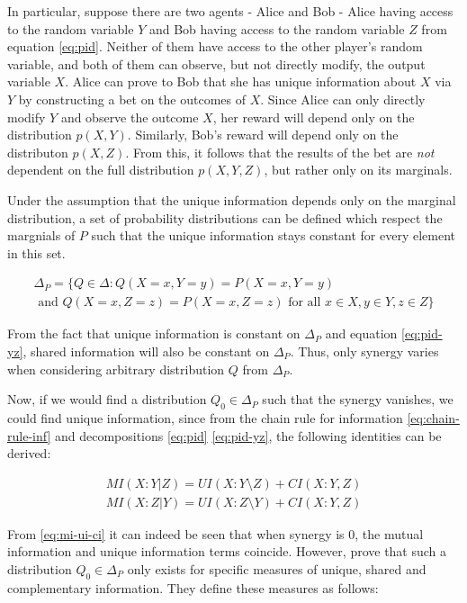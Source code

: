 \documentclass[12pt]{article}
\begin{document}
In particular, suppose there are two agents - Alice and Bob - Alice having access to the random variable $Y$ and Bob having access to the random variable $Z$ from equation \ref{eq:pid}. Neither of them have access to the other player's random variable, and both of them can observe, but not directly modify, the output variable $X$. Alice can prove to Bob that she has unique information about $X$ via $Y$ by constructing a bet on the outcomes of $X$. Since Alice can only directly modify $Y$ and observe the outcome $X$, her reward will depend only on the distribution $p(X,Y)$. Similarly, Bob's reward will depend only on the distributon $p(X,Z)$. From this, it follows that the results of the bet are \textit{not} dependent on the full distribution $p(X,Y,Z)$, but rather only on its marginals.

Under the assumption that the unique information depends only on the  marginal distribution, a set of probability distributions can be defined which respect the margnials of $P$ such that the unique information stays constant for every element in this set.

\begin{multline*}
\Delta_P = \{Q \in \Delta: Q(X=x, Y=y) = P(X=x, Y=y) \\ 
\text{ and }  Q(X=x, Z=z) = P(X=x, Z=z) \text{ for all } x \in X, y \in Y, z \in Z\}
\end{multline*}

From the fact that unique information is constant on $\Delta_P$ and equation \ref{eq:pid-yz}, shared information will also be constant on $\Delta_P$. Thus, only synergy varies when considering arbitrary distribution $Q$ from $\Delta_P$.

Now, if we would find a distribution $Q_0 \in \Delta_P$ such that the synergy vanishes, we could find unique information, since from the chain rule for information \ref{eq:chain-rule-inf} and decompositions \ref{eq:pid} \ref{eq:pid-yz}, the following identities can be derived: 

\begin{equation}
\begin{split}
MI(X:Y|Z) = UI(X:Y \setminus Z) + CI(X:Y,Z) \\ 
MI(X:Z|Y) = UI(X:Z \setminus Y) + CI(X:Y,Z)
\label{eq:mi-ui-ci}
\end{split}
\end{equation}

From \ref{eq:mi-ui-ci} it can indeed be seen that when synergy is $0$, the mutual information and unique information terms coincide. However, \cite{bertschinger} prove that such a distribution $Q_0 \in \Delta_P$ only exists for specific measures of unique, shared and complementary information. They define these measures as follows:
\end{document}
